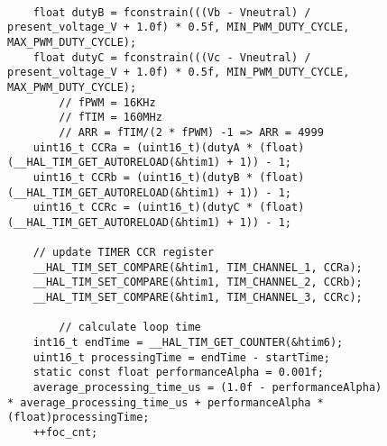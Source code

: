 \begin{figure}[H]
	\centering
	\begin{verbatim}
	
    float dutyB = fconstrain(((Vb - Vneutral) / present_voltage_V + 1.0f) * 0.5f, MIN_PWM_DUTY_CYCLE, MAX_PWM_DUTY_CYCLE);
    float dutyC = fconstrain(((Vc - Vneutral) / present_voltage_V + 1.0f) * 0.5f, MIN_PWM_DUTY_CYCLE, MAX_PWM_DUTY_CYCLE);
        // fPWM = 16KHz
        // fTIM = 160MHz
        // ARR = fTIM/(2 * fPWM) -1 => ARR = 4999
    uint16_t CCRa = (uint16_t)(dutyA * (float)(__HAL_TIM_GET_AUTORELOAD(&htim1) + 1)) - 1;
    uint16_t CCRb = (uint16_t)(dutyB * (float)(__HAL_TIM_GET_AUTORELOAD(&htim1) + 1)) - 1;
    uint16_t CCRc = (uint16_t)(dutyC * (float)(__HAL_TIM_GET_AUTORELOAD(&htim1) + 1)) - 1;

    // update TIMER CCR register
    __HAL_TIM_SET_COMPARE(&htim1, TIM_CHANNEL_1, CCRa);
    __HAL_TIM_SET_COMPARE(&htim1, TIM_CHANNEL_2, CCRb);
    __HAL_TIM_SET_COMPARE(&htim1, TIM_CHANNEL_3, CCRc);

		// calculate loop time
    int16_t endTime = __HAL_TIM_GET_COUNTER(&htim6);
    uint16_t processingTime = endTime - startTime;
    static const float performanceAlpha = 0.001f;
    average_processing_time_us = (1.0f - performanceAlpha) * average_processing_time_us + performanceAlpha * (float)processingTime;
    ++foc_cnt;
	\end{verbatim}
\end{figure}

\newpage
{}


